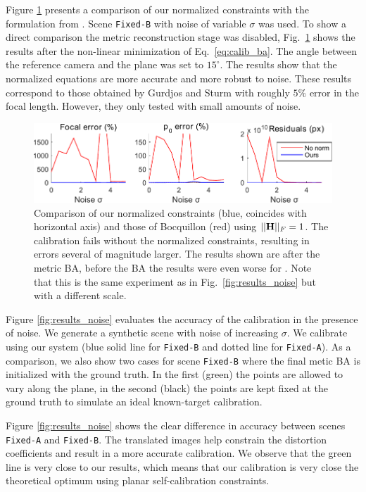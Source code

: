 \documentclass[10pt,twocolumn,letterpaper]{article}
\begin{document}
Figure \ref{fig:results_no_norm} presents a comparison of our normalized constraints with the formulation from \cite{bocquillon2006}. Scene \texttt{Fixed-B} with noise of variable $\sigma$ was used. To show a direct comparison the metric reconstruction stage was disabled, Fig.~\ref{fig:results_no_norm} shows the results after the non-linear minimization of Eq.~\eqref{eq:calib_ba}. The angle between the reference camera and the plane was set to $15^\circ$. The results show that the normalized equations are more accurate and more robust to noise. These results correspond to those obtained by Gurdjos and Sturm \cite{gurdjos2003} with roughly $5\%$ error in the focal length. However, they only tested with small amounts of noise.

\begin{figure}
\centering
\includegraphics[width=\linewidth]{images/resultsNoNorm2.pdf}
\caption{Comparison of our normalized constraints (blue, coincides with horizontal axis) and those of Bocquillon \cite{bocquillon2006} (red) using $||\mathbf{H}||_F=1$. The calibration fails without the normalized constraints, resulting in errors several of magnitude larger. The results shown are after the metric BA, before the BA the results were even worse for \cite{bocquillon2006}. Note that this is the same experiment as in Fig.~\ref{fig:results_noise} but with a different scale.}
\label{fig:results_no_norm}
\end{figure}

Figure \ref{fig:results_noise} evaluates the accuracy of the calibration in the presence of noise. We generate a synthetic scene with noise of increasing $\sigma$. We calibrate using our system (blue solid line for \texttt{Fixed-B} and dotted line for \texttt{Fixed-A}). As a comparison, we also show two cases for scene \texttt{Fixed-B} where the final metic BA is initialized with the ground truth. In the first (green) the points are allowed to vary along the plane, in the second (black) the points are kept fixed at the ground truth to simulate an ideal known-target calibration. 

Figure \ref{fig:results_noise} shows the clear difference in accuracy between scenes \texttt{Fixed-A} and \texttt{Fixed-B}. The translated images help constrain the distortion coefficients and result in a more accurate calibration. We observe that the green line is very close to our results, which means that our calibration is very close the theoretical optimum using planar self-calibration constraints. 
\end{document}

